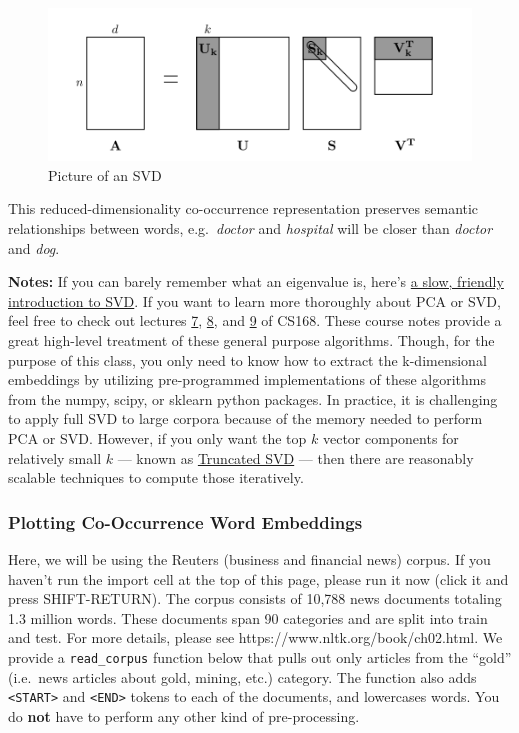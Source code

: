\documentclass[11pt]{article}
\begin{document}
\begin{figure}
\centering
\includegraphics{./imgs/svd.png}
\caption{Picture of an SVD}
\end{figure}

This reduced-dimensionality co-occurrence representation preserves
semantic relationships between words, e.g.~\emph{doctor} and
\emph{hospital} will be closer than \emph{doctor} and \emph{dog}.

\textbf{Notes:} If you can barely remember what an eigenvalue is, here's
\href{https://davetang.org/file/Singular_Value_Decomposition_Tutorial.pdf}{a
slow, friendly introduction to SVD}. If you want to learn more
thoroughly about PCA or SVD, feel free to check out lectures
\href{https://web.stanford.edu/class/cs168/l/l7.pdf}{7},
\href{http://theory.stanford.edu/~tim/s15/l/l8.pdf}{8}, and
\href{https://web.stanford.edu/class/cs168/l/l9.pdf}{9} of CS168. These
course notes provide a great high-level treatment of these general
purpose algorithms. Though, for the purpose of this class, you only need
to know how to extract the k-dimensional embeddings by utilizing
pre-programmed implementations of these algorithms from the numpy,
scipy, or sklearn python packages. In practice, it is challenging to
apply full SVD to large corpora because of the memory needed to perform
PCA or SVD. However, if you only want the top \(k\) vector components
for relatively small \(k\) --- known as
\href{https://en.wikipedia.org/wiki/Singular_value_decomposition\#Truncated_SVD}{Truncated
SVD} --- then there are reasonably scalable techniques to compute those
iteratively.

    \hypertarget{plotting-co-occurrence-word-embeddings}{%
\subsubsection{Plotting Co-Occurrence Word
Embeddings}\label{plotting-co-occurrence-word-embeddings}}

Here, we will be using the Reuters (business and financial news) corpus.
If you haven't run the import cell at the top of this page, please run
it now (click it and press SHIFT-RETURN). The corpus consists of 10,788
news documents totaling 1.3 million words. These documents span 90
categories and are split into train and test. For more details, please
see https://www.nltk.org/book/ch02.html. We provide a
\texttt{read\_corpus} function below that pulls out only articles from
the ``gold'' (i.e.~news articles about gold, mining, etc.) category. The
function also adds \texttt{\textless{}START\textgreater{}} and
\texttt{\textless{}END\textgreater{}} tokens to each of the documents,
and lowercases words. You do \textbf{not} have to perform any other kind
of pre-processing.
\end{document}
